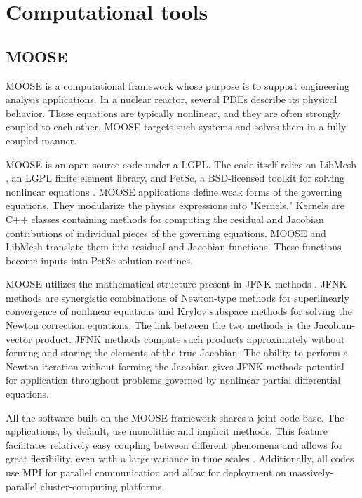 
\section{Computational tools}

\subsection{MOOSE}

\gls{MOOSE}\cite{gaston_moose_2009} is a computational framework whose purpose is to support engineering analysis applications.
In a nuclear reactor, several \glspl{PDE} describe its physical behavior.
These equations are typically nonlinear, and they are often strongly coupled to each other.
\gls{MOOSE} targets such systems and solves them in a fully coupled manner.

\gls{MOOSE} is an open-source code under a \gls{LGPL}.
The code itself relies on LibMesh \cite{kirk_libmesh_2006}, an LGPL finite element library, and PetSc, a \gls{BSD}-licensed toolkit for solving nonlinear equations \cite{balay_petsc_2016}.
MOOSE applications define weak forms of the governing equations.
They modularize the physics expressions into "Kernels."
Kernels are C++ classes containing methods for computing the residual and Jacobian contributions of individual pieces of the governing equations.
\gls{MOOSE} and LibMesh translate them into residual and Jacobian functions.
These functions become inputs into PetSc solution routines.

\gls{MOOSE} utilizes the mathematical structure present in \gls{JFNK} methods \cite{knoll_jacobian-free_2004}.
\gls{JFNK} methods are synergistic combinations of Newton-type methods for superlinearly convergence of nonlinear equations and Krylov subspace methods for solving the Newton correction equations.
The link between the two methods is the Jacobian-vector product.
\gls{JFNK} methods compute such products approximately without forming and storing the elements of the true Jacobian.
The ability to perform a Newton iteration without forming the Jacobian gives \gls{JFNK} methods potential for application throughout problems governed by nonlinear partial differential equations.

All the software built on the \gls{MOOSE} framework shares a joint code base.
The applications, by default, use monolithic and implicit methods.
This feature facilitates relatively easy coupling between different phenomena and allows for great flexibility, even with a large variance in time scales \cite{novak_pronghorn_2018}.
Additionally, all codes use MPI for parallel communication and allow for deployment on massively-parallel cluster-computing platforms.

